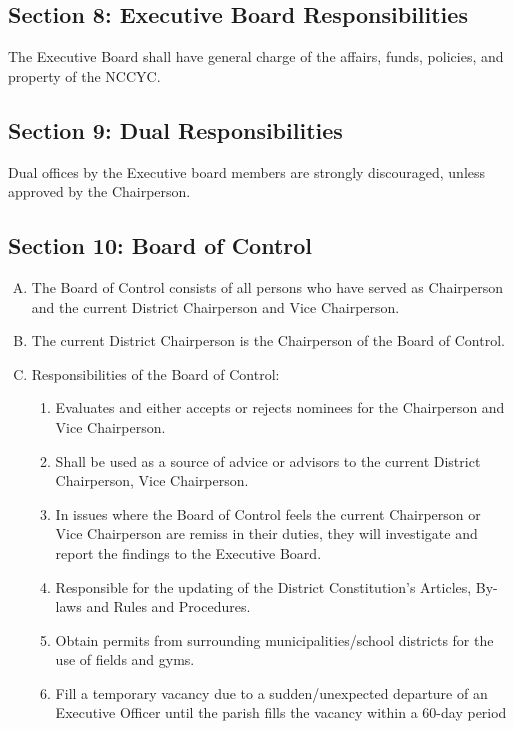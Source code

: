 \subsection{Section 8: Executive Board Responsibilities}
\label{ssec:const-4-8}
The Executive Board shall have general charge of the affairs, funds, policies, and property of the NCCYC.

\subsection{Section 9: Dual Responsibilities}
\label{ssec:const-4-9}
Dual offices by the Executive board members are strongly discouraged, unless approved by the Chairperson.

\subsection{Section 10: Board of Control}
\label{ssec:const-4-10}
\begin{enumerate}[A.]
    \item The Board of Control consists of all persons who have served as Chairperson and the current District 
    Chairperson and Vice Chairperson.
    \item The current District Chairperson is the Chairperson of the Board of Control.
    \item Responsibilities of the Board of Control:
    \begin{enumerate}[1.]
        \item Evaluates and either accepts or rejects nominees for the Chairperson and Vice Chairperson.
        \item Shall be used as a source of advice or advisors to the current District Chairperson, Vice Chairperson. 
        \item In issues where the Board of Control feels the current Chairperson or Vice Chairperson are remiss in their duties, they will investigate and report the findings to the Executive Board.
        \item Responsible for the updating of the District Constitution’s Articles, By-laws and Rules and Procedures.
        \item Obtain permits from surrounding municipalities/school districts for the use of fields and gyms.
        \item Fill a temporary vacancy due to a sudden/unexpected departure of an Executive Officer until the parish fills the vacancy within a 60-day period
    \end{enumerate}
\end{enumerate}

